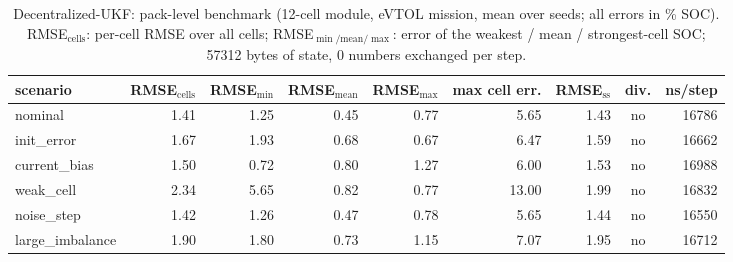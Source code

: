 \begin{table}[H]\centering\footnotesize\setlength{\tabcolsep}{4pt}\caption{Decentralized-UKF: pack-level benchmark (12-cell module, eVTOL mission, mean over seeds; all errors in \% SOC). RMSE$_\mathrm{cells}$: per-cell RMSE over all cells; RMSE$_{\min/\mathrm{mean}/\max}$: error of the weakest / mean / strongest-cell SOC; 57312 bytes of state, 0 numbers exchanged per step.}\label{tab:pack_DecentralizedUKF}
\begin{tabular}{lrrrrrrcr}\toprule scenario & RMSE$_\mathrm{cells}$ & RMSE$_{\min}$ & RMSE$_\mathrm{mean}$ & RMSE$_{\max}$ & max cell err. & RMSE$_\mathrm{ss}$ & div. & ns/step \\ \midrule
nominal & 1.41 & 1.25 & 0.45 & 0.77 & 5.65 & 1.43 & no & 16786 \\
init\_error & 1.67 & 1.93 & 0.68 & 0.67 & 6.47 & 1.59 & no & 16662 \\
current\_bias & 1.50 & 0.72 & 0.80 & 1.27 & 6.00 & 1.53 & no & 16988 \\
weak\_cell & 2.34 & 5.65 & 0.82 & 0.77 & 13.00 & 1.99 & no & 16832 \\
noise\_step & 1.42 & 1.26 & 0.47 & 0.78 & 5.65 & 1.44 & no & 16550 \\
large\_imbalance & 1.90 & 1.80 & 0.73 & 1.15 & 7.07 & 1.95 & no & 16712 \\
\bottomrule\end{tabular}\end{table}
